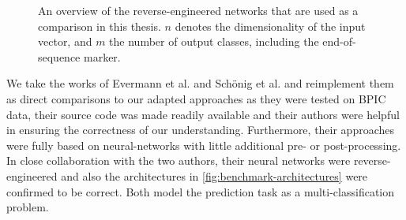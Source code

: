 \begin{figure}
\centering
{}
\qquad
{}
\caption[Overview of the reverse-engineered networks]{An overview of the reverse-engineered networks that are used as a comparison in this thesis. $n$ denotes the dimensionality of the input vector, and $m$ the number of output classes, including the end-of-sequence marker.}
\label{fig:benchmark-architectures}
\end{figure}

We take the works of Evermann et al. and Schönig et al. and reimplement them as direct comparisons to our adapted approaches as they were tested on BPIC data, their source code was made readily available and their authors were helpful in ensuring the correctness of our understanding. Furthermore, their approaches were fully based on neural-networks with little additional pre- or post-processing. In close collaboration with the two authors, their neural networks were reverse-engineered and also the architectures in \autoref{fig:benchmark-architectures} were confirmed to be correct. Both model the prediction task as a multi-classification problem.

